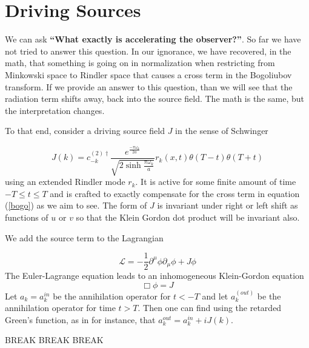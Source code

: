 \documentclass[12pt,a4paper]{article}
\begin{document}
\section{Driving Sources}

We can ask {\bf ``What exactly is accelerating the observer?''}.  So far we have not tried to answer this question.  In our ignorance, we have recovered, in the math, that something is going on in normalization when restricting from Minkowski space to Rindler space that causes a cross term in the Bogoliubov transform.  If we provide an answer to this question, than we will see that the radiation term shifts away, back into the source field.  The math is the same, but the interpretation changes.

To that end, consider a driving source field $J$ in the sense of Schwinger \cite{schwinger} 

\begin{equation}
  J(k) = c_{-k}^{(2)\dagger} \frac{e^\frac{-\pi \omega_k}{2a}}{\sqrt{2 \sinh \frac{\pi \omega_k}{a}}} r_k(x,t) \theta(T - t) \theta(T+t)
\end{equation}
using an extended Rindler mode $r_k$.  It is active for some finite amount of time $-T \le t \le T$ and is crafted to exactly compensate for the cross term in equation (\ref{bogo}) as we aim to see.  The form of $J$ is invariant under right or left shift as functions of $u$ or $v$ so that the Klein Gordon dot product will be invariant also.

We add the source term to the Lagrangian

\begin{equation}
\mathscr{L} = -\frac{1}{2} \partial^\mu \phi \partial_\mu \phi + J\phi
\end{equation}
The Euler-Lagrange equation leads to an inhomogeneous Klein-Gordon equation
\begin{equation}
  \Box  \phi = J
\end{equation}
Let $a_k = a_k^{in}$ be the annihilation operator for $t<-T$ and let $a_k^{(out)}$ be the annihilation operator for time $t > T$.  Then one can find using the retarded Green's function, as in \cite{beisert} for instance, that $a_k^{out} = a_k^{in} + i J(k)$.



BREAK BREAK BREAK
\end{document}
